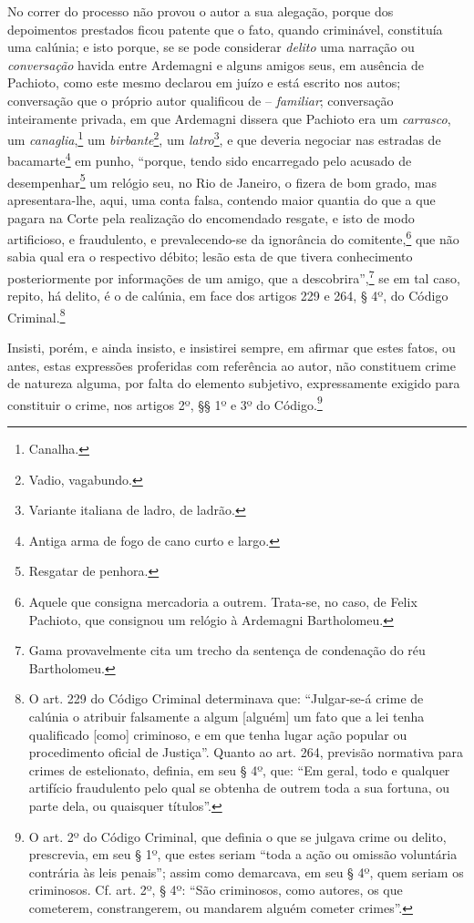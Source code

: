 {\begin{flushright}
No correr do processo não provou o autor a sua alegação, porque dos
depoimentos prestados ficou patente que o fato, quando criminável,
constituía uma calúnia; e isto porque, se se pode considerar
\emph{delito} uma narração ou \emph{conversação} havida entre Ardemagni
e alguns amigos seus, em ausência de Pachioto, como este mesmo declarou
em juízo e está escrito nos autos; conversação que o próprio autor
qualificou de -- \emph{familiar}; conversação inteiramente privada, em
que Ardemagni dissera que Pachioto era um \emph{carrasco}, um
\emph{canaglia},\footnote{ Canalha.} um \emph{birbante}\footnote{
  Vadio, vagabundo.}, um \emph{latro}\footnote{ Variante italiana de
  ladro, de ladrão.}, e que deveria negociar nas estradas de
bacamarte\footnote{ Antiga arma de fogo de cano curto e largo.} em
punho, ``porque, tendo sido encarregado pelo acusado de
desempenhar\footnote{ Resgatar de penhora.} um relógio seu, no Rio de
Janeiro, o fizera de bom grado, mas apresentara-lhe, aqui, uma conta
falsa, contendo maior quantia do que a que pagara na Corte pela
realização do encomendado resgate, e isto de modo artificioso, e
fraudulento, e prevalecendo-se da ignorância do comitente,\footnote{
  Aquele que consigna mercadoria a outrem. Trata-se, no caso, de Felix
  Pachioto, que consignou um relógio à Ardemagni Bartholomeu.} que não
sabia qual era o respectivo débito; lesão esta de que tivera
conhecimento posteriormente por informações de um amigo, que a
descobrira'',\footnote{ Gama provavelmente cita um trecho da sentença de
  condenação do réu Bartholomeu.} se em tal caso, repito, há delito, é o
de calúnia, em face dos artigos 229 e 264, § 4º, do Código
Criminal.\footnote{ O art. 229 do Código Criminal determinava que:
  ``Julgar-se-á crime de calúnia o atribuir falsamente a algum
  {[}alguém{]} um fato que a lei tenha qualificado {[}como{]} criminoso,
  e em que tenha lugar ação popular ou procedimento oficial de Justiça''.
  Quanto ao art. 264, previsão normativa para crimes de estelionato,
  definia, em seu § 4º, que: ``Em geral, todo e qualquer artifício
  fraudulento pelo qual se obtenha de outrem toda a sua fortuna, ou
  parte dela, ou quaisquer títulos''.}

Insisti, porém, e ainda insisto, e insistirei sempre, em afirmar que
estes fatos, ou antes, estas expressões proferidas com referência ao
autor, não constituem crime de natureza alguma, por falta do elemento
subjetivo, expressamente exigido para constituir o crime, nos artigos
2º, §§ 1º e 3º do Código.\footnote{ O art. 2º do Código Criminal, que
  definia o que se julgava crime ou delito, prescrevia, em seu § 1º, que
  estes seriam ``toda a ação ou omissão voluntária contrária às leis
  penais''; assim como demarcava, em seu § 4º, quem seriam os criminosos.
  Cf. art. 2º, § 4º: ``São criminosos, como autores, os que cometerem,
  constrangerem, ou mandarem alguém cometer crimes''.}


\end{flushright}}
